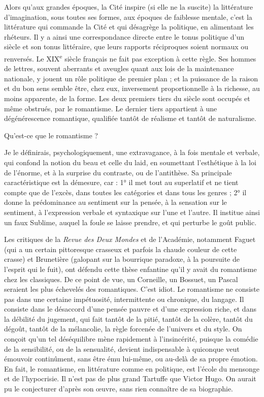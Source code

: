 \documentclass[french,twoside]{book} %
\newcommand\chaptercont{} %
\renewcommand\chaptercont{} %
\begin{document}
\chaptercont
\noindent Alors qu’aux grandes époques, la Cité inspire (si elle ne la suscite) la littérature d’imagination, sous toutes ses formes, aux époques de faiblesse mentale, c’est la littérature qui commande la Cité et qui désagrège la politique, en alimentant les rhéteurs. Il y a ainsi une correspondance directe entre le tonus politique d’un siècle et son tonus littéraire, que leurs rapports réciproques soient normaux ou renversés. Le XIX\textsuperscript{e} siècle français ne fait pas exception à cette règle. Ses hommes de lettres, souvent aberrants et aveugles quant aux lois de la maintenance nationale, y jouent un rôle politique de premier plan ; et la puissance de la raison et du bon sens semble être, chez eux, inversement proportionnelle à la richesse, au moins apparente, de la forme. Les deux premiers tiers du siècle sont occupés et même obstrués, par le romantisme. Le dernier tiers appartient à une dégénérescence romantique, qualifiée tantôt de réalisme et tantôt de naturalisme.\par
Qu’est-ce que le romantisme ?\par
Je le définirais, psychologiquement, une extravagance, à la fois mentale et verbale, qui confond la notion du beau et celle du laid, en soumettant l’esthétique à la loi de l’énorme, et à la surprise du contraste, ou de l’antithèse. Sa principale caractéristique est la démesure, car : 1° il met tout au superlatif et ne tient compte que de l’excès, dans toutes les catégories et dans tous les genres ; 2° il donne la prédominance au sentiment sur la pensée, à la sensation sur le sentiment, à l’expression verbale et syntaxique sur l’une et l’autre. Il institue ainsi un faux Sublime, auquel la foule se laisse prendre, et qui perturbe le goût public.\par
Les critiques de la {\itshape Revue des Deux Mondes} et de l’Académie, notamment Faguet (qui a un certain pittoresque crasseux et parfois la chaude couleur de cette crasse) et Brunetière (galopant sur la bourrique paradoxe, à la poursuite de l’esprit qui le fuit), ont défendu cette thèse enfantine qu’il y avait du romantisme chez les classiques. De ce point de vue, un Corneille, un Bossuet, un Pascal seraient les plus échevelés des romantiques. C’est idiot. Le romantisme ne consiste pas dans une certaine impétuosité, intermittente ou chronique, du langage. Il consiste dans le désaccord d’une pensée pauvre et d’une expression riche, et dans la débilité du jugement, qui fait tantôt de la pitié, tantôt de la colère, tantôt du dégoût, tantôt de la mélancolie, la règle forcenée de l’univers et du style. On conçoit qu’un tel déséquilibre mène rapidement à l’insincérité, puisque la comédie de la sensibilité, ou de la sensualité, devient indispensable à quiconque veut émouvoir continûment, sans être ému lui-même, ou au-delà de sa propre émotion. En fait, le romantisme, en littérature comme en politique, est l’école du mensonge et de l’hypocrisie. Il n’est pas de plus grand Tartuffe que Victor Hugo. On aurait pu le conjecturer d’après son œuvre, sans rien connaître de sa biographie.\par
\end{document}
